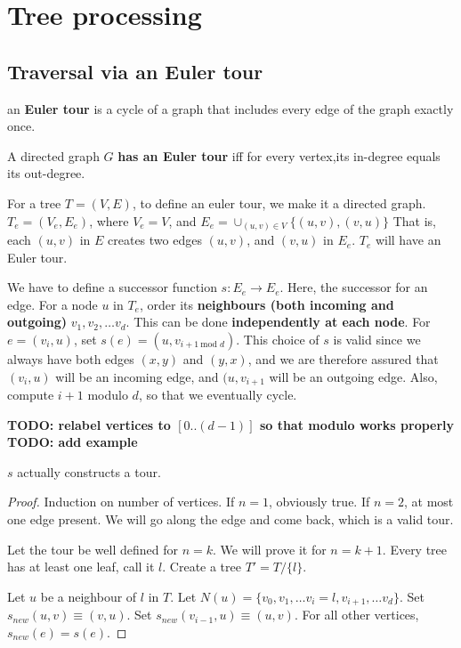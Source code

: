 \chapter{Tree processing}
\section{Traversal via an Euler tour}
\begin{definition}
an \textbf{Euler tour} is a cycle of a graph that includes every edge of the
graph exactly once.
\end{definition}

\begin{lemma}
A directed graph $G$ \textbf{has an Euler tour} iff for every vertex,its in-degree
equals its out-degree.
\end{lemma}

For a tree $T = (V, E)$, to define an euler tour, we make it a directed graph.
$T_e = (V_e, E_e)$, where $V_e = V$, and $E_e = \cup_{(u,v) \in V} \{ (u, v), (v, u) \}$
That is, each $(u, v)$ in $E$ creates two edges $(u, v)$, and $(v, u)$ in $E_e$.
$T_e$ will have an Euler tour.


We have to define a successor function $s: E_e \to E_e$. Here, the successor for an edge.
For a node $u$ in $T_e$, order its \textbf{neighbours (both incoming and outgoing)}
$v_1, v_2, \dots v_d$. This can be done \textbf{independently at each node}. 
For $e = (v_i, u)$, set $s(e) = (u, v_{i + 1~\text{mod $d$}})$. This choice of $s$ is valid
since we always have both edges $(x, y)$ and $(y, x)$, and we are therefore
assured that $(v_i, u)$ will be an incoming edge, and $(u, v_{i + 1}$ will be
an outgoing edge. Also, compute $i + 1$ modulo $d$, so that we eventually
cycle.

\textbf{TODO: relabel vertices to $[0..(d - 1)]$ so that modulo works properly}
\textbf{TODO: add example}

\begin{theorem}
$s$ actually constructs a tour.
\end{theorem}
\begin{proof}
Induction on number of vertices. If $n = 1$, obviously true. 
If $n = 2$, at most one edge present. We will go along the edge and come back,
which is a valid tour.


Let the tour be well defined for $n = k$. We will prove it for $n = k + 1$.
Every tree has at least one leaf, call it $l$. Create a tree $T' = T/\{l\}$.

Let $u$ be a neighbour of $l$ in $T$.
Let $N(u) = \{ v_0, v_1, \dots v_i = l, v_{i + 1}, \dots v_d \}$.
Set $s_{new}(u, v) \equiv (v, u)$. Set $s_{new}(v_{i - 1}, u) \equiv (u, v)$.
For all other vertices, $s_{new}(e) = s(e)$.
\end{proof}


